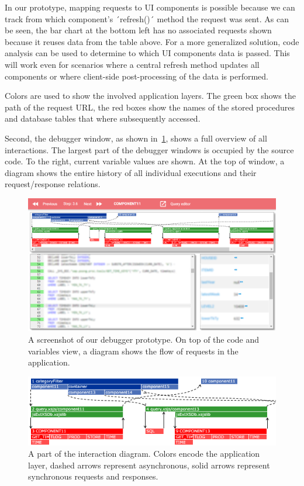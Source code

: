 \documentclass[
      english,
			conference,
      ]{IEEEtran}
\begin{document}
In our prototype, mapping requests to UI components is possible because we can track from which component's ´refresh()´ method the request was sent.
As can be seen, the bar chart at the bottom left has no associated requests shown because it reuses data from the table above.
For a more generalized solution, code analysis can be used to determine to which UI components data is passed.
This will work even for scenarios where a central refresh method updates all components or where client-side post-processing of the data is performed.

Colors are used to show the involved application layers.
The green box shows the path of the request URL, the red boxes show the names of the stored procedures and database tables that where subsequently accessed.

Second, the debugger window, as shown in~\cref{fig:debugger}, shows a full overview of all interactions.
The largest part of the debugger windows is occupied by the source code.
To the right, current variable values are shown.
At the top of window, a diagram shows the entire history of all individual executions and their request/response relations.

\begin{figure}
	\centering
		\includegraphics[width=1.00\linewidth]{debugger_full.png}
	\caption{A screenshot of our debugger prototype. On top of the code and variables view, a diagram shows the flow of requests in the application.}
	\label{fig:debugger}
\end{figure}

\begin{figure}
	\centering
		\includegraphics[width=1.00\linewidth]{executions.png}
	\caption{A part of the interaction diagram. Colors encode the application layer, dashed arrows represent asynchronous, solid arrows represent synchronous requests and responses.}
	\label{fig:executions}
\end{figure}
\end{document}
